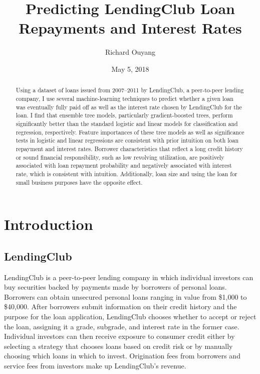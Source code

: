 \documentclass[12pt]{article}
\title{Predicting LendingClub Loan Repayments and Interest Rates}
\author{Richard Ouyang}
\date{May 5, 2018}
\begin{document}
\maketitle

\begin{abstract}
Using a dataset of loans issued from 2007--2011 by LendingClub, a peer-to-peer lending company, I use several machine-learning techniques to predict whether a given loan was eventually fully paid off as well as the interest rate chosen by LendingClub for the loan. I find that ensemble tree models, particularly gradient-boosted trees, perform significantly better than the standard logistic and linear models for classification and regression, respectively. Feature importances of these tree models as well as significance tests in logistic and linear regressions are consistent with prior intuition on both loan repayment and interest rates. Borrower characteristics that reflect a long credit history or sound financial responsibility, such as low revolving utilization, are positively associated with loan repayment probability and negatively associated with interest rate, which is consistent with intuition. Additionally, loan size and using the loan for small business purposes have the opposite effect.
\end{abstract}

\section{Introduction}

\subsection{LendingClub}

LendingClub \cite{lendingclub} is a peer-to-peer lending company in which individual investors can buy securities backed by payments made by borrowers of personal loans. Borrowers can obtain unsecured personal loans ranging in value from \$1,000 to \$40,000. After borrowers submit information on their credit history and the purpose for the loan application, LendingClub chooses whether to accept or reject the loan, assigning it a grade, subgrade, and interest rate in the former case. Individual investors can then receive exposure to consumer credit either by selecting a strategy that chooses loans based on credit risk or by manually choosing which loans in which to invest. Origination fees from borrowers and service fees from investors make up LendingClub's revenue.
\end{document}
